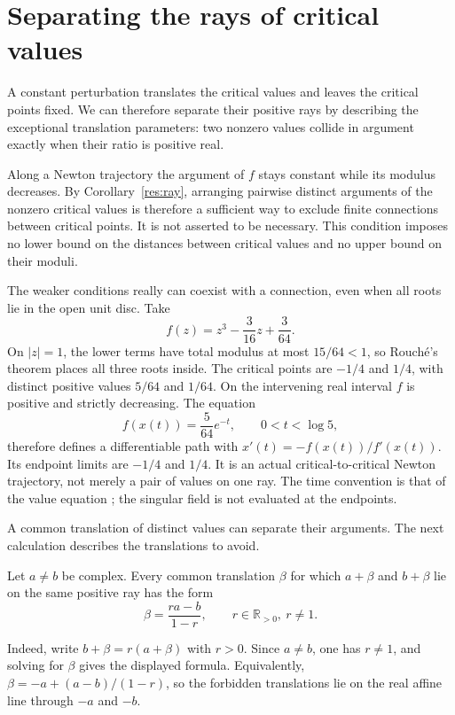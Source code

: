 \section{Separating the rays of critical values}\label{sec:arguments}

A constant perturbation translates the critical values and leaves the
critical points fixed. We can therefore separate their positive rays
by describing the exceptional translation parameters: two nonzero
values collide in argument exactly when their ratio is positive real.

Along a Newton trajectory the argument of $f$ stays constant while its
modulus decreases. By Corollary~\ref{res:ray}, arranging pairwise distinct
arguments of the nonzero critical values is therefore a sufficient way
to exclude finite connections between critical points. It is not asserted
to be necessary. This condition imposes no lower bound on the distances
between critical values and no upper bound on their moduli.

The weaker conditions really can coexist with a connection, even when
all roots lie in the open unit disc. Take
\[
 f(z)=z^3-\frac3{16}z+\frac3{64}.
\]
On $|z|=1$, the lower terms have total modulus at most $15/64<1$, so
Rouch\'e's theorem places all three roots inside. The critical points
are $-1/4$ and $1/4$, with distinct positive values $5/64$ and $1/64$.
On the intervening real interval $f$ is positive and strictly decreasing.
The equation
\[
 f(x(t))=\frac5{64}e^{-t},\qquad 0<t<\log5,
\]
therefore defines a differentiable path with
$x'(t)=-f(x(t))/f'(x(t))$. Its endpoint limits are $-1/4$ and $1/4$.
It is an actual critical-to-critical Newton trajectory, not merely a
pair of values on one ray. The time convention is that of the value
equation \cite[Lemma~2.1]{kozen-stefansson1997}; the singular field is
not evaluated at the endpoints.

A common translation of distinct values can separate their arguments.
The next calculation describes the translations to avoid.

\begin{theorem}\label{res:locus}
Let $a\ne b$ be complex.  Every common translation $\beta$ for which $a+\beta$
and $b+\beta$ lie on the same positive ray has the form
\[
  \beta=\frac{ra-b}{1-r},
  \qquad r\in\mathbb{R}_{>0},\ r\ne1 .
\]
\end{theorem}

Indeed, write $b+\beta=r(a+\beta)$ with $r>0$. Since $a\ne b$,
one has $r\ne1$, and solving for $\beta$ gives the displayed formula.
Equivalently, $\beta=-a+(a-b)/(1-r)$, so the forbidden translations
lie on the real affine line through $-a$ and $-b$.

